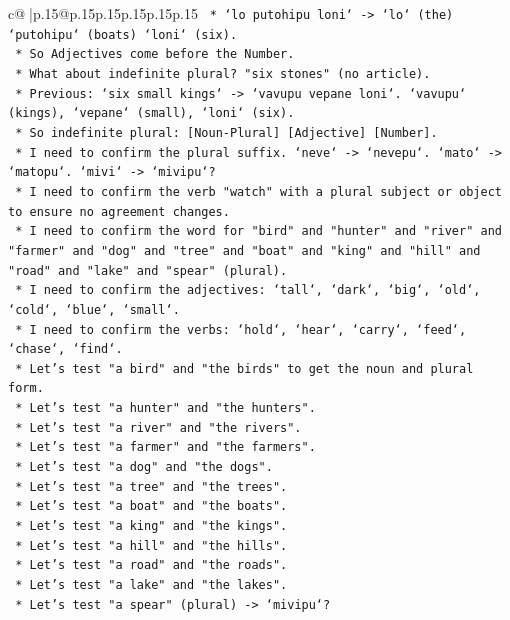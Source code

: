 \documentclass{article}
\begin{document}
{\begin{supertabular}{c@{$\;$}|p{.15\linewidth}@{}p{.15\linewidth}p{.15\linewidth}p{.15\linewidth}p{.15\linewidth}p{.15\linewidth}}
{{{\texttt{    *   `lo putohipu loni` {-}> `lo` (the) `putohipu` (boats) `loni` (six).} \\
\texttt{    *   So Adjectives come before the Number.} \\
\texttt{    *   What about indefinite plural? "six stones" (no article).} \\
\texttt{    *   Previous: `six small kings` {-}> `vavupu vepane loni`. `vavupu` (kings), `vepane` (small), `loni` (six).} \\
\texttt{    *   So indefinite plural: {[}Noun{-}Plural{]} {[}Adjective{]} {[}Number{]}.} \\
\texttt{    *   I need to confirm the plural suffix. `neve` {-}> `nevepu`. `mato` {-}> `matopu`. `mivi` {-}> `mivipu`?} \\
\texttt{    *   I need to confirm the verb "watch" with a plural subject or object to ensure no agreement changes.} \\
\texttt{    *   I need to confirm the word for "bird" and "hunter" and "river" and "farmer" and "dog" and "tree" and "boat" and "king" and "hill" and "road" and "lake" and "spear" (plural).} \\
\texttt{    *   I need to confirm the adjectives: `tall`, `dark`, `big`, `old`, `cold`, `blue`, `small`.} \\
\texttt{    *   I need to confirm the verbs: `hold`, `hear`, `carry`, `feed`, `chase`, `find`.} \\
\texttt{    *   Let's test "a bird" and "the birds" to get the noun and plural form.} \\
\texttt{    *   Let's test "a hunter" and "the hunters".} \\
\texttt{    *   Let's test "a river" and "the rivers".} \\
\texttt{    *   Let's test "a farmer" and "the farmers".} \\
\texttt{    *   Let's test "a dog" and "the dogs".} \\
\texttt{    *   Let's test "a tree" and "the trees".} \\
\texttt{    *   Let's test "a boat" and "the boats".} \\
\texttt{    *   Let's test "a king" and "the kings".} \\
\texttt{    *   Let's test "a hill" and "the hills".} \\
\texttt{    *   Let's test "a road" and "the roads".} \\
\texttt{    *   Let's test "a lake" and "the lakes".} \\
\texttt{    *   Let's test "a spear" (plural) {-}> `mivipu`?} \\
}}}
\end{supertabular}}
\end{document}
